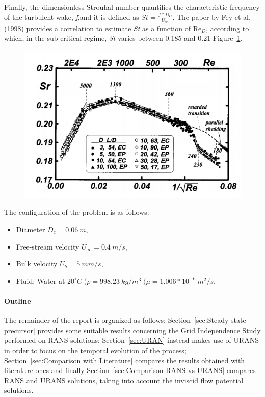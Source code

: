 \documentclass[12pt]{article}
\begin{document}
        Finally, the dimensionless Strouhal number quantifies the characteristic frequency of the turbulent wake, \textit{f},and it is defined as $St= \frac{f*D_C}{U_\infty}$. The paper by Fey et al. (1998) provides a correlation to estimate \textit{St} as a function of $\text{Re}_D$, according to which, in the sub-critical regime, \textit{St} varies between 0.185 and 0.21 Figure~\ref{fig:strouhal}.


 \begin{figure}[!ht]
                \includegraphics[width=\textwidth]{Strouhal.png}
                \centering
                \caption{}
                \label{fig:strouhal}
        \end{figure}


        The configuration of the problem is as follows:
        \begin{itemize}
                \item Diameter \( D_c = 0.06 \: m \),
                \item Free-stream velocity \( U_\infty = 0.4 \: m/s \),
                \item Bulk velocity \( U_b = 5 \: mm/s \),
                \item Fluid: Water at \( 20^{\circ}C \; ( \rho = 998.23 \: kg/m^3\;( \mu=1.006*10^{-6} \:m^2/s\).
        \end{itemize}


        \paragraph{Outline}
        The remainder of the report is organized as follows: Section~\ref{sec:Steady-state precursor} provides some suitable results concerning the Grid Independence Study performed on RANS solutions; Section~\ref{sec:URAN} instead makes use of URANS in order to focus on the temporal evolution  of the process; Section~\ref{sec:Comparison with Literature} compares the results obtained with literature ones and finally  Section~\ref{sec:Comparison RANS vs URANS} compares RANS and URANS solutions, taking into account the inviscid flow potential solutions.
      
\end{document}
